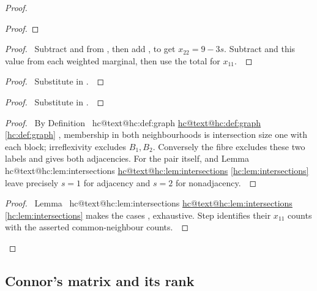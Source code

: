 \documentclass[11pt]{amsart}
\makeatletter
\let\qed\relax
\let\hcSavedRef\ref
\renewcommand{\ref}[1]{%
  \ifcsname hc@text@#1\endcsname
    \hyperlink{\csname hc@target@#1\endcsname}{\csname hc@text@#1\endcsname}%
  \else
    \hcSavedRef{#1}%
  \fi}}
\makeatother
\begin{document}
\begin{proof}
\begin{proof}
 \end{proof}
 \begin{proof}\pf\ Subtract  and
   from , then add
  , to get $x_{22}=9-3s$.
  Subtract  and this value from each weighted
  marginal, then use the total for $x_{11}$.~\qed\end{proof}
 \begin{proof}\pf\ Substitute  in .~\qed\end{proof}
 \begin{proof}\pf\ Substitute  in .~\qed\end{proof}
 \begin{proof}\pf\ By Definition~\ref{hc:def:graph}, membership
  in both neighbourhoods is intersection size one with each block;
  irreflexivity excludes $B_1,B_2$. Conversely the fibre excludes
  these two labels and gives both adjacencies. For the pair itself,
   and Lemma~\ref{hc:lem:intersections} leave precisely
  $s=1$ for adjacency and $s=2$ for nonadjacency.~\qed\end{proof}
 \qedstep
 \begin{proof}\pf\ Lemma~\ref{hc:lem:intersections} makes the cases
  ,  exhaustive.
  Step  identifies their $x_{11}$
  counts with the asserted common-neighbour counts.~\qed\end{proof}
\end{proof}

\subsection{Connor's matrix and its rank}
\end{document}
